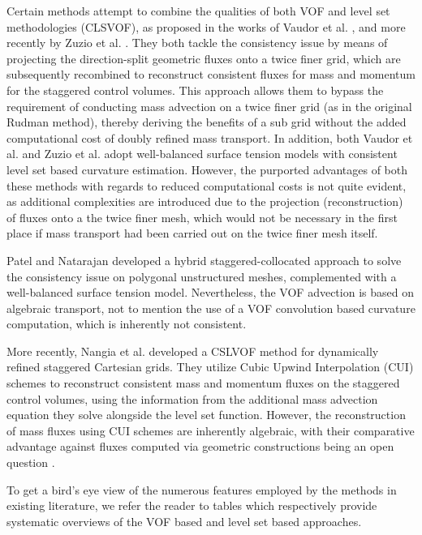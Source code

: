 Certain methods attempt to combine the qualities of both 
VOF and level set methodologies (CLSVOF), as proposed in the works of 
Vaudor et al. , 
and more recently by Zuzio et al. \cite{zuzio2020new}. 
They both tackle the consistency issue by means of projecting 
the direction-split geometric fluxes onto a twice finer grid, 
which are subsequently recombined to reconstruct consistent 
fluxes for mass and momentum for the staggered control volumes. 
This approach allows them to bypass the requirement of conducting 
mass advection on a twice finer grid (as in the original Rudman method), 
thereby deriving the benefits of a sub grid without the 
added computational cost of doubly refined mass transport. 
In addition, both Vaudor et al. \cite{vaudor2017consistent} and 
Zuzio et al.  adopt well-balanced surface tension 
models with consistent level set based curvature estimation. 
However, the purported advantages of both these methods with 
regards to reduced computational costs is not quite evident, 
as additional complexities are introduced due to the projection 
(reconstruction) of fluxes onto a the twice finer mesh, 
which would not be necessary in the first place if mass transport 
had been carried out on the twice finer mesh itself. 


Patel and Natarajan  developed a hybrid 
staggered-collocated approach to solve the consistency issue on 
polygonal unstructured meshes, complemented with a well-balanced surface tension model. 
Nevertheless, the VOF advection is based on algebraic transport, 
not to mention the use of a VOF convolution based 
curvature computation, which is inherently not consistent. 


More recently, Nangia et al.  developed a 
CSLVOF method for dynamically refined staggered Cartesian grids. 
They utilize Cubic Upwind Interpolation (CUI) schemes to 
reconstruct consistent mass and momentum fluxes on the staggered 
control volumes, using the information from the additional mass 
advection equation they solve alongside the level set function.   
However, the reconstruction of mass fluxes using CUI schemes are 
inherently algebraic, with their comparative advantage against fluxes 
computed via geometric constructions being an open question 
.

To get a bird's eye view of the numerous features employed by the methods 
in existing literature, we refer the reader to tables %
which respectively provide systematic overviews of the VOF based and level set based approaches.    

